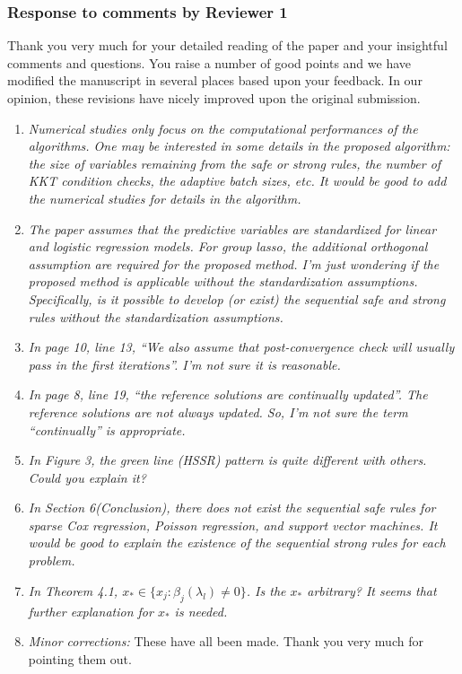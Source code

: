 \documentclass{article}
\begin{document}
\subsubsection*{Response to comments by Reviewer 1}

Thank you very much for your detailed reading of the paper and your insightful comments and questions. You raise a number of good points and we have modified the manuscript in several places based upon your feedback.  In our opinion, these revisions have nicely improved upon the original submission.

\begin{enumerate}

\item \emph{Numerical studies only focus on the computational performances of the algorithms. One may be interested in some details in the proposed algorithm: the size of variables remaining from the safe or strong rules, the number of KKT condition checks, the adaptive batch sizes, etc. It would be good to add the numerical studies for details in the algorithm.}

\item \emph{The paper assumes that the predictive variables are standardized for linear and logistic regression models. For group lasso, the additional orthogonal assumption are required for the proposed method. I’m just wondering if the proposed method is applicable without the standardization assumptions. Specifically, is it possible to develop (or exist) the sequential safe and strong rules without the standardization assumptions.}

\item \emph{In page 10, line 13, ``We also assume that post-convergence check will usually pass in the first iterations''. I’m not sure it is reasonable.}

\item \emph{In page 8, line 19, ``the reference solutions are continually updated''. The reference solutions are not always updated. So, I’m not sure the term ``continually'' is appropriate.}

\item \emph{In Figure 3, the green line (HSSR) pattern is quite different with others. Could you explain it?}

\item \emph{In Section 6(Conclusion), there does not exist the sequential safe rules for sparse Cox regression, Poisson regression, and support vector machines. It would be good to explain the existence of the sequential strong rules for each problem.}

\item \emph{In Theorem 4.1, $x_* \in \{ x_j : \hat{\beta}_j(\lambda_l) \ne 0 \}$. Is the $x_*$ arbitrary? It seems that further explanation for $x_*$ is needed.}

\item \emph{Minor corrections:} These have all been made. Thank you very much for pointing them out.

\end{enumerate}
\end{document}
